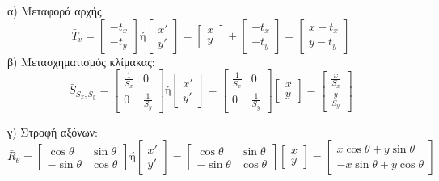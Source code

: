  α) Μεταφορά αρχής:
\[
\bar{T}_v =\begin{bmatrix}
-t_x \\-t_y
\end{bmatrix}
\text{ή}
\begin{bmatrix}
x' \\y'
\end{bmatrix}
=
\begin{bmatrix}
x \\y
\end{bmatrix}
+
\begin{bmatrix}
-t_x \\-t_y
\end{bmatrix}
=
\begin{bmatrix}
x - t_x \\y - t_y
\end{bmatrix}
\]
 β) Μετασχηματισμός κλίμακας:
\[
\bar{S}_{S_x,S_y} =
\begin{bmatrix}
\frac{1}{S_x} & 0 \\
0 & \frac{1}{S_y}
\end{bmatrix}
\text{ή}
\begin{bmatrix} x' \\ y' \end{bmatrix} =
\begin{bmatrix} \frac{1}{S_x} & 0 \\ 0 & \frac{1}{S_y} \end{bmatrix}
\begin{bmatrix} x \\ y \end{bmatrix} =
\begin{bmatrix} \frac{x}{S_x} \\ \frac{y}{S_y} \end{bmatrix}
\]

 γ) Στροφή αξόνων:
\[
\bar{R}_{\theta} =
\begin{bmatrix}
\cos\theta & \sin\theta \\
-\sin\theta & \cos\theta
\end{bmatrix}
\text{ή}
\begin{bmatrix} x' \\ y' \end{bmatrix} =
\begin{bmatrix}
\cos\theta & \sin\theta \\
-\sin\theta & \cos\theta
\end{bmatrix}
\begin{bmatrix} x \\ y \end{bmatrix} =
\begin{bmatrix} x \cos\theta + y \sin\theta \\
-x \sin\theta + y \cos\theta \end{bmatrix}
\]

